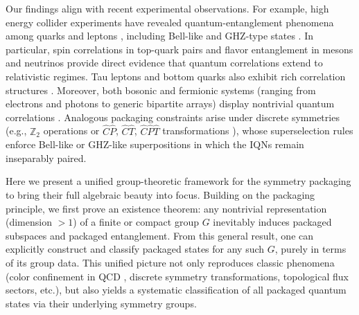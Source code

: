 \documentclass[12pt,a4paper]{article}
\begin{document}
Our findings align with recent experimental observations.
For example, high energy collider experiments have revealed quantum-entanglement phenomena among quarks and leptons \cite{TheATLASCollaboration2024,FabbrichesiFloreaniniGabrielli2023,Afik2024,TheCMSCollaboration2024,HayrapetyanCMSCollaboration2024,Blasone2009,Go2007}, including Bell-like and GHZ-type states \cite{AfikNova2021,AfikNova2022,Barr2022,AguilarSaavedra2023}.  In particular, spin correlations in top-quark pairs \cite{TheATLASCollaboration2024,TheCMSCollaboration2024,HayrapetyanCMSCollaboration2024} and flavor entanglement in mesons and neutrinos \cite{Blasone2009,Go2007} provide direct evidence that quantum correlations extend to relativistic regimes.  Tau leptons and bottom quarks also exhibit rich correlation structures \cite{Afik2024,AfikNova2023}.  Moreover, both bosonic and fermionic systems (ranging from electrons and photons to generic bipartite arrays) display nontrivial quantum correlations \cite{Li2001,Zanardi2002,Eckert2002,Li2014}.  Analogous packaging constraints arise under discrete symmetries (e.g., $\mathbb{Z}_2$ operations \cite{Artin2014,Georgi2000} or $\hat C\hat P$, $\hat C\hat T$, $\hat C\hat P\hat T$ transformations \cite{Luders1957}), whose superselection rules enforce Bell-like or GHZ-like \cite{GHZ1990,Mermin1990,Caves2002,GHZ2007} superpositions in which the IQNs remain inseparably paired.


Here we present a unified group-theoretic framework \cite{Artin2014,Georgi2000} for the symmetry packaging to bring their full algebraic beauty into focus.
Building on the packaging principle, we first prove an existence theorem:
any nontrivial representation (dimension $>1$) \cite{Wigner1939,Georgi2000} of a finite or compact group $G$ inevitably induces packaged subspaces and packaged entanglement.
From this general result, one can explicitly construct and classify packaged states for any such $G$, purely in terms of its group data.
This unified picture not only reproduces classic phenomena (color confinement in QCD \cite{Gross1973,Politzer1973}, discrete symmetry transformations, topological flux sectors, etc.), but also yields a systematic classification of all packaged quantum states via their underlying symmetry groups.
\end{document}
